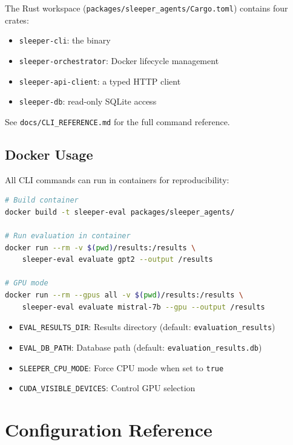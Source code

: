 \documentclass[11pt,letterpaper]{article}
\let\origsubsection\subsection
\renewcommand{\subsection}{\needspace{8\baselineskip}\origsubsection}}
\begin{document}
The Rust workspace (\texttt{packages/sleeper\_agents/Cargo.toml}) contains four crates:
\begin{itemize}[nosep]
  \item \texttt{sleeper-cli}: the binary
  \item \texttt{sleeper-orchestrator}: Docker lifecycle management
  \item \texttt{sleeper-api-client}: a typed HTTP client
  \item \texttt{sleeper-db}: read-only SQLite access
\end{itemize}
See \texttt{docs/CLI\_REFERENCE.md} for the full command reference.

\subsection{Docker Usage}

All CLI commands can run in containers for reproducibility:

\begin{lstlisting}[language=bash, basicstyle=\ttfamily\scriptsize]
# Build container
docker build -t sleeper-eval packages/sleeper_agents/

# Run evaluation in container
docker run --rm -v $(pwd)/results:/results \
    sleeper-eval evaluate gpt2 --output /results

# GPU mode
docker run --rm --gpus all -v $(pwd)/results:/results \
    sleeper-eval evaluate mistral-7b --gpu --output /results
\end{lstlisting}

\begin{infobox}
\begin{itemize}[nosep]
  \item \texttt{EVAL\_RESULTS\_DIR}: Results directory (default: \texttt{evaluation\_results})
  \item \texttt{EVAL\_DB\_PATH}: Database path (default: \texttt{evaluation\_results.db})
  \item \texttt{SLEEPER\_CPU\_MODE}: Force CPU mode when set to \texttt{true}
  \item \texttt{CUDA\_VISIBLE\_DEVICES}: Control GPU selection
\end{itemize}
\end{infobox}

\section{Configuration Reference}
\label{sec:config}
\end{document}
